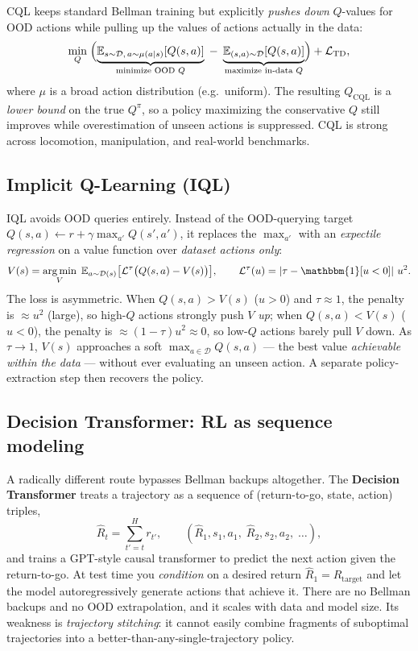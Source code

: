 \documentclass[11pt, oneside]{book}
\newcommand{\E}{\mathbb{E}}              %
\newcommand{\ind}{\mathbbm{1}}
\newcommand{\argmin}{\operatorname*{arg\,min}}
\newcommand{\abs}[1]{\left\lvert #1 \right\rvert}
\newcommand{\loss}{\mathcal{L}}          %
\newcommand{\dataset}{\mathcal{D}}       %
\newcommand{\params}{\boldsymbol{\theta}}   %
\begin{document}
CQL keeps standard Bellman training but explicitly \emph{pushes down} $Q$-values for OOD
actions while pulling up the values of actions actually in the data:
\[
  \min_Q\; \Bigl(\underbrace{\E_{s\sim\dataset,\, a\sim\mu(a\mid s)}[Q(s,a)]}_{\text{minimize OOD }Q}
  \;-\; \underbrace{\E_{(s,a)\sim\dataset}[Q(s,a)]}_{\text{maximize in-data }Q}\Bigr)
  + \loss_{\text{TD}},
\]
where $\mu$ is a broad action distribution (e.g.\ uniform). The resulting $Q_{\text{CQL}}$
is a \emph{lower bound} on the true $Q^\pi$, so a policy maximizing the conservative
$Q$ still improves while overestimation of unseen actions is suppressed. CQL is strong
across locomotion, manipulation, and real-world benchmarks.

\subsection{Implicit Q-Learning (IQL)}

IQL avoids OOD queries entirely. Instead of the OOD-querying target
$Q(s,a) \leftarrow r + \gamma \max_{a'} Q(s', a')$, it replaces the $\max_{a'}$ with an
\emph{expectile regression} on a value function over \emph{dataset actions only}:
\[
  V(s) = \argmin_V\; \E_{a\sim\dataset(s)}\bigl[\loss^\tau\bigl(Q(s,a) - V(s)\bigr)\bigr],
  \qquad
  \loss^\tau(u) = \abs{\tau - \ind[u < 0]}\, u^2.
\]
The loss is asymmetric. When $Q(s,a) > V(s)$ ($u>0$) and $\tau \approx 1$, the penalty
is $\approx u^2$ (large), so high-$Q$ actions strongly push $V$ \emph{up}; when
$Q(s,a) < V(s)$ ($u<0$), the penalty is $\approx (1-\tau)u^2 \approx 0$, so low-$Q$
actions barely pull $V$ down. As $\tau \to 1$, $V(s)$ approaches a soft
$\max_{a\in\dataset} Q(s,a)$ --- the best value \emph{achievable within the data} ---
without ever evaluating an unseen action. A separate policy-extraction step then recovers
the policy.

\subsection{Decision Transformer: RL as sequence modeling}

A radically different route bypasses Bellman backups altogether. The
\textbf{Decision Transformer} treats a trajectory as a sequence of
(return-to-go, state, action) triples,
\[
  \hat R_t = \sum_{t'=t}^{H} r_{t'}, \qquad
  (\hat R_1, s_1, a_1,\; \hat R_2, s_2, a_2,\; \dots),
\]
and trains a GPT-style causal transformer to predict the next action given the
return-to-go. At test time you \emph{condition} on a desired return $\hat R_1 = R_{\text{target}}$
and let the model autoregressively generate actions that achieve it. There are no Bellman
backups and no OOD extrapolation, and it scales with data and model size. Its weakness is
\emph{trajectory stitching}: it cannot easily combine fragments of suboptimal trajectories
into a better-than-any-single-trajectory policy.
\end{document}
